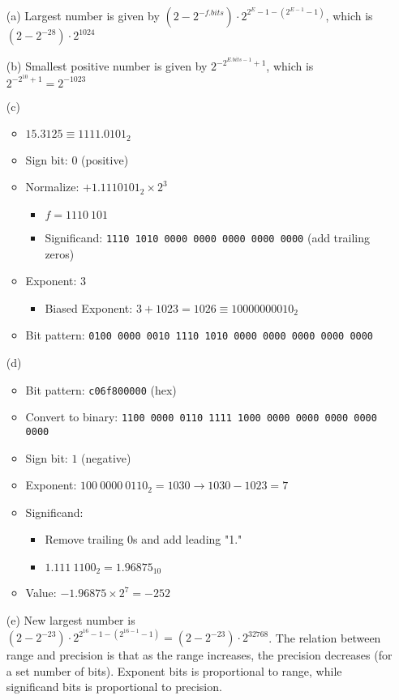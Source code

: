 \documentclass{article}
\begin{document}
\begin{enumerate}
    \item[(a)] Largest number is given by $(2-2^{-f.bits}) \cdot 2^{2^{E}-1-(2^{E-1}-1)}$, which is $(2-2^{-28}) \cdot 2^{1024}$
    \item[(b)] Smallest positive number is given by $2^{-2^{E.bits-1}+1}$, which is $2^{-2^{10}+1} = 2^{-1023}$
    \item[(c)] \begin{itemize}
              \item $15.3125 \equiv 1111.0101_2$
              \item Sign bit: $0$ (positive)
              \item Normalize: $+1.1110101_2 \times 2^3$
                    \begin{itemize}
                        \item $f=1110\ 101$
                        \item Significand: \texttt{1110 1010 0000 0000 0000 0000 0000} (add trailing zeros)
                    \end{itemize}
              \item Exponent: 3
                    \begin{itemize}
                        \item Biased Exponent: $3+1023=1026 \equiv 10000000010_2$
                    \end{itemize}
              \item Bit pattern: \texttt{0100 0000 0010 1110 1010 0000 0000 0000 0000 0000}
          \end{itemize}
    \item[(d)]
          \begin{itemize}
              \item Bit pattern: \texttt{c06f800000} (hex)
              \item Convert to binary: \texttt{1100 0000 0110 1111 1000 0000 0000 0000 0000 0000}
              \item Sign bit: $1$ (negative)
              \item Exponent: $100\ 0000\ 0110_2 = 1030 \rightarrow 1030 - 1023 = 7$
              \item Significand:
                    \begin{itemize}
                        \item Remove trailing 0s and add leading "1."
                        \item $1.111\ 1100_2 = 1.96875_{10}$
                    \end{itemize}
              \item Value: $-1.96875 \times 2^7 = -252$
          \end{itemize}
    \item[(e)] New largest number is $(2-2^{-23}) \cdot 2^{2^{16}-1-(2^{16-1}-1)} = (2-2^{-23}) \cdot 2^{32768}$. The relation between range and precision is that as the range increases, the precision decreases (for a set number of bits). Exponent bits is proportional to range, while significand bits is proportional to precision.
\end{enumerate}
\end{document}
